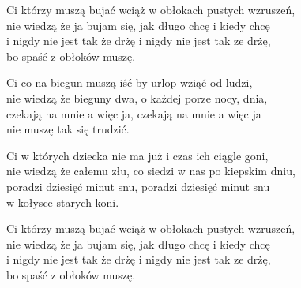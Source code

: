 \begin{text}
    Ci którzy muszą bujać wciąż w obłokach pustych wzruszeń,\\
    nie wiedzą że ja bujam się, jak długo chcę i kiedy chcę\\
    i nigdy nie jest tak że drżę i nigdy nie jest tak ze drżę,\\
    bo spaść z obłoków muszę.

    Ci co na biegun muszą iść by urlop wziąć od ludzi,\\
    nie wiedzą że bieguny dwa, o każdej porze nocy, dnia,\\
    czekają na mnie a więc ja, czekają na mnie a więc ja\\
    nie muszę tak się trudzić.

    Ci w których dziecka nie ma już i czas ich ciągle goni,\\
    nie wiedzą że całemu złu, co siedzi w nas po kiepskim dniu,\\
    poradzi dziesięć minut snu, poradzi dziesięć minut snu\\
    w kołysce starych koni.

    Ci którzy muszą bujać wciąż w obłokach pustych wzruszeń,\\
    nie wiedzą że ja bujam się, jak długo chcę i kiedy chcę\\
    i nigdy nie jest tak że drżę i nigdy nie jest tak ze drżę,\\
    bo spaść z obłoków muszę.
\end{text}
\begin{chord}

\end{chord}